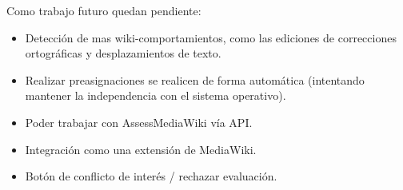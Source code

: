 Como trabajo futuro quedan pendiente:
\begin{itemize}
	\item Detección de mas wiki-comportamientos, como las ediciones de correcciones ortográficas y desplazamientos de texto.
	\item Realizar preasignaciones se realicen de forma automática (intentando mantener la independencia con el sistema operativo).
	\item Poder trabajar con AssessMediaWiki vía API.
	\item Integración como una extensión de MediaWiki.
	\item Botón de conflicto de interés / rechazar evaluación.
	
	
\end{itemize}